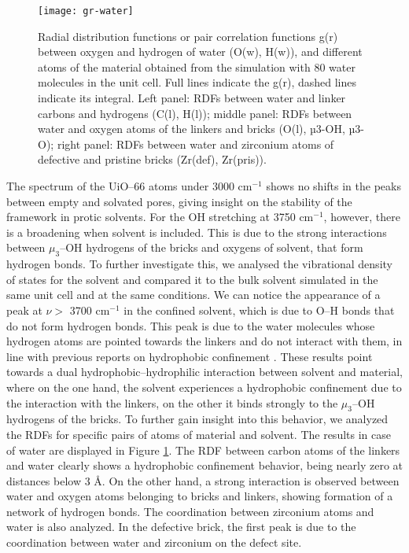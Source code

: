 \begin{figure}[!htbp]
	\centering
	\texttt{[image: gr-water]}
	\caption{Radial distribution functions or pair correlation functions g(r) between oxygen and hydrogen of water (O(w), H(w)), and different atoms of the material obtained from the simulation with 80 water molecules in the unit cell. Full lines indicate the g(r), dashed lines indicate its integral. Left panel: RDFs between water and linker carbons and hydrogens (C(l), H(l)); middle panel: RDFs between water and oxygen atoms of the linkers and bricks (O(l), µ3-OH, µ3-O); right panel: RDFs between water and zirconium atoms of defective and pristine bricks (Zr(def), Zr(pris)). }
	\label{fig:gr-water}
\end{figure}
The spectrum of the UiO--66 atoms under 3000 cm$^{-1}$ shows no shifts in the peaks between empty and solvated pores, giving insight on the stability of the framework in protic solvents. For the OH stretching at 3750 cm$^{-1}$, however, there is a broadening when solvent is included. This is due to the strong interactions between $\mu_3$--OH hydrogens of the bricks and oxygens of solvent, that form hydrogen bonds. To further investigate this, we analysed the vibrational density of states for the solvent and compared it to the bulk solvent simulated in the same unit cell and at the same conditions. We can notice the appearance of a peak at $\nu >$ 3700 cm$^{-1}$ in the confined solvent, which is due to O--H bonds that do not form hydrogen bonds. This peak is due to the water molecules whose hydrogen atoms are pointed towards the linkers and do not interact with them, in line with previous reports on hydrophobic confinement \cite{coudert2006dipole, dalla2016water, cicero2008water}. 
\npar
These results point towards a dual hydrophobic--hydrophilic interaction between solvent and material, where on the one hand, the solvent experiences a hydrophobic confinement due to the interaction with the linkers, on the other it binds strongly to the $\mu_3$--OH hydrogens of the bricks. To further gain insight into this behavior, we analyzed the RDFs for specific pairs of atoms of material and solvent. The results in case of water are displayed in Figure \ref{fig:gr-water}. The RDF between carbon atoms of the linkers and water clearly shows a hydrophobic confinement behavior, being nearly zero at distances below 3 \AA. On the other hand, a strong interaction is observed between water and oxygen atoms belonging to bricks and linkers, showing formation of a network of hydrogen bonds. The coordination between zirconium atoms and water is also analyzed. In the defective brick, the first peak is due to the coordination between water and zirconium on the defect site. 
